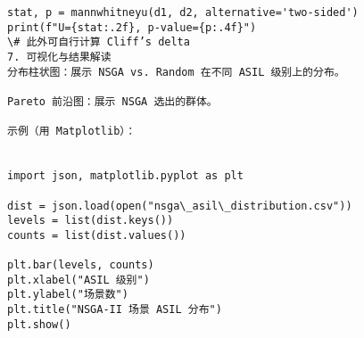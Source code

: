 \begin{lstlisting}
stat, p = mannwhitneyu(d1, d2, alternative='two-sided')
print(f"U={stat:.2f}, p-value={p:.4f}")
\# 此外可自行计算 Cliff’s delta
7. 可视化与结果解读
分布柱状图：展示 NSGA vs. Random 在不同 ASIL 级别上的分布。
  	
Pareto 前沿图：展示 NSGA 选出的群体。
  	
示例（用 Matplotlib）：
  	
  	
import json, matplotlib.pyplot as plt
  	
dist = json.load(open("nsga\_asil\_distribution.csv"))
levels = list(dist.keys())
counts = list(dist.values())
  	
plt.bar(levels, counts)
plt.xlabel("ASIL 级别")
plt.ylabel("场景数")
plt.title("NSGA-II 场景 ASIL 分布")
plt.show()
  \end{lstlisting}
